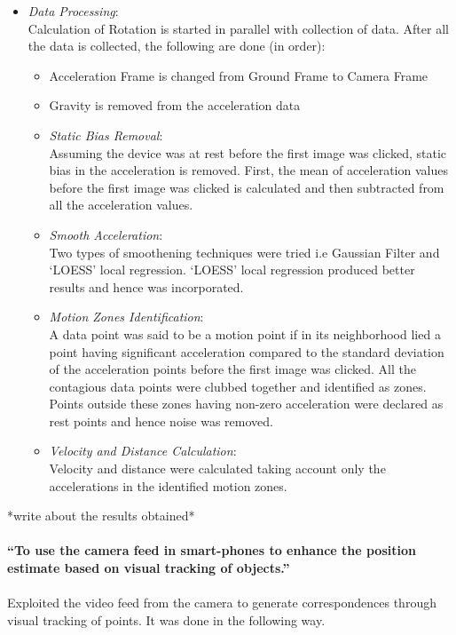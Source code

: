 \documentclass{article}
\begin{document}
\begin{itemize}
			\item \textit{Data Processing}:\\ Calculation of Rotation is started in parallel with collection of data. After all the data is collected, the following are done (in order):
				\begin{itemize}
				\item Acceleration Frame is changed from Ground Frame to Camera Frame
				\item Gravity is removed from the acceleration data
				\item \textit{Static Bias Removal}:\\Assuming the device was at rest before the first image was clicked, static bias in the acceleration is removed. First, the mean of acceleration values before the first image was clicked is calculated and then subtracted from all the acceleration values.
				\item \textit{Smooth Acceleration}:\\
				Two types of smoothening techniques were tried i.e Gaussian Filter and `LOESS' local regression. `LOESS' local regression produced better results and hence was incorporated. 
				\item \textit{Motion Zones Identification}:\\ A data point was said to be a motion point if in its neighborhood lied a point having significant acceleration compared to the standard deviation of the acceleration points before the first image was clicked. All the contagious data points were clubbed together and identified as zones. Points outside these zones having non-zero acceleration were declared as rest points and hence noise was removed.
				\item \textit{Velocity and Distance Calculation}:\\ Velocity and distance were calculated taking account only the accelerations in the identified motion zones.
				\end{itemize}
		\end{itemize}
		*write about the results obtained*
		\\
		\vspace{3mm}
		\\
		\textbf{``To use the camera feed in smart-phones to enhance the position estimate based on visual tracking of objects.''}
		\\
		\vspace{3mm}
		\\
		Exploited the video feed from the camera to generate correspondences through visual tracking of points. It was done in the following way.
\end{document}
